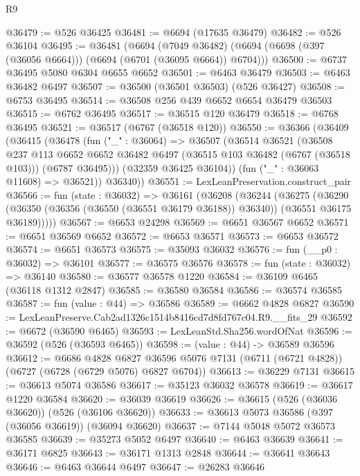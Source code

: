 \begin{lexlean}{R9}
\begin{coremodule}
@36479 := @526 @36425
@36481 := @6694 (@17635 @36479)
@36482 := @526 @36104
@36495 := @36481
    (@6694
      (@7049 @36482)
      (@6694 (@6698 (@397 (@36056 @6664))) (@6694 (@6701 (@36095 @6664)) @6704)))
@36500 := @6737 @36495 @5080 @6304 @6655 @6652
@36501 := @6463 @36479
@36503 := @6463 @36482 @6497
@36507 := @36500 (@36501 @36503) (@526 @36427)
@36508 := @6753 @36495
@36514 := @36508 @256 @439 @6652 @6654 @36479 @36503
@36515 := @6762 @36495
@36517 := @36515 @120 @36479
@36518 := @6768 @36495
@36521 := @36517 (@6767 (@36518 @120))
@36550 := @36366
    (@36409
      (@36415
        (@36478
          (fun ("_" : @36064) =>
          @36507
            (@36514
              @36521
              (@36508
                @237
                @113
                @6652
                @6652
                @36482
                @6497
                (@36515 @103 @36482 (@6767 (@36518 @103)))
                (@6787 @36495)))
            (@32359 @36425 @36104))
          (fun ("_" : @36063 @11608) => @36521))
        @36340))
@36551 := LexLeanPreservation.construct_pair
@36566 := fun (state : @36032) =>
  @36161
    (@36208
      (@36244
        (@36275
          (@36290
            (@36350 (@36356 (@36550 (@36551 @36179 @36188)) @36340))
            (@36551 @36175 @36189)))))
@36567 := @6653 @24298
@36569 := @6651 @36567 @6652
@36571 := @6651 @36569 @6652
@36572 := @6653 @36571
@36573 := @6653 @36572
@36574 := @6651 @36573
@36575 := @35093 @36032
@36576 := fun (__p0 : @36032) => @36101
@36577 := @36575 @36576
@36578 := fun (state : @36032) => @36140
@36580 := @36577 @36578 @1220
@36584 := @36109 @6465 (@36118 @1312 @2847)
@36585 := @36580 @36584
@36586 := @36574 @36585
@36587 := fun (value : @44) => @36586
@36589 := @6662 @4828 @6827
@36590 := LexLeanPreserve.Cab2ad1326c1514b8416cd7d8fd767c04.R9.__fits_29
@36592 := @6672 (@36590 @6465)
@36593 := LexLeanStd.Sha256.wordOfNat
@36596 := @36592 (@526 (@36593 @6465))
@36598 := (value : @44) -> @36589 @36596
@36612 := @6686
    @4828
    @6827
    @36596
    @5076
    @7131
    (@6711 (@6721 @4828))
    (@6727 (@6728 (@6729 @5076) @6827 @6704))
@36613 := @36229 @7131
@36615 := @36613 @5074 @36586
@36617 := @35123 @36032 @36578
@36619 := @36617 @1220 @36584
@36620 := @36039 @36619
@36626 := @36615 (@526 (@36036 @36620)) (@526 (@36106 @36620))
@36633 := @36613 @5073 @36586 (@397 (@36056 @36619)) (@36094 @36620)
@36637 := @7144 @5048 @5072 @36573 @36585
@36639 := @35273 @5052 @6497
@36640 := @6463 @36639
@36641 := @36171 @6825
@36643 := @36171 @1313 @2848
@36644 := @36641 @36643
@36646 := @6463 @36644 @6497
@36647 := @26283 @36646

\end{coremodule}
\end{lexlean}
